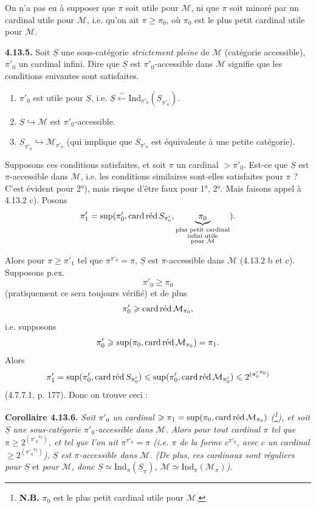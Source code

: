 \documentclass[11pt]{article}
\newcommand{\msp}[1]{\marginpar{\footnotesize [#1]}}
\newcommand{\Ind}{\mathrm{Ind}}
\newcommand{\card}{\operatorname{card}}
\newcommand{\M}{\mathcal{M}}
\newcommand{\red}{\mathop{\textup{réd}}\nolimits}
\newcommand{\uS}{\underline{S}}
\begin{document}
On n'a pas eu à supposer que $\pi$ soit utile pour $\M$, ni que $\pi$ soit minoré par un cardinal utile pour $\M$, i.e. qu'on ait $\pi \geqslant \pi_0$, où $\pi_0$ est le plus petit cardinal utile pour $\M$.

\msp{page 289}
\textbf{4.13.5.} Soit $\uS$ une sous-catégorie \textit{strictement pleine} de $\M$ (catégorie accessible), $\pi'_0$ un cardinal infini. Dire que $\uS$ est $\pi'_0$-accessible dans $\M$ signifie que les conditions suivantes sont satisfaites.
\begin{enumerate}
\item[1)] $\pi'_0$ est utile pour $\uS$, i.e. $\uS \xleftarrow{\sim} \Ind_{\pi'_0}(\uS_{\pi'_0})$.
\item[2)] $\uS \hookrightarrow \M$ est $\pi'_0$-accessible.
\item[3)] $\uS_{\pi'_0} \hookrightarrow \M_{\pi'_0}$ (qui implique que $S_{\pi'_0}$ est équivalente à une petite catégorie).
\end{enumerate}
Supposons ces conditions satisfaites, et soit $\pi$ un cardinal $> \pi'_0$. Est-ce que $\uS$ est $\pi$-accessible dans $\M$, i.e. les conditions similaires sont-elles satisfaites pour $\pi$ ? C'est évident pour 2°), mais risque d'être faux pour 1°, 2°. Mais faisons appel à 4.13.2 c). Posons
\[
\pi'_1 = \sup(\pi'_0, \card\red S_{\pi'_0}, \underbrace{\pi_0}_{\substack{\text{plus petit cardinal}\\ \text{infini utile}\\ \text{pour } \M}} ) .
\]

\msp{page 290}
Alors pour $\pi \geqslant \pi'_1$ tel que $\pi^{\pi'_0} = \pi$, $\uS$ est $\pi$-accessible dans $\M$ (4.13.2 b et c). Supposons p.ex.
\[
\pi'_0 \geqslant \pi_0
\]
(pratiquement ce sera toujours vérifié) et de plus
\[
\pi'_0 \geqslant \card\red\M_{\pi_0} ,
\]
i.e. supposons
\[
\pi'_0 \geqslant \sup(\pi_0, \card\red\M_{\pi_0}) = \pi_1 .
\]
Alors
\[
\pi'_1 = \sup(\pi'_0, \card\red S_{\pi'_0}) \leqslant \sup(\pi'_0, \card\red\M_{\pi'_0}) \leqslant 2^{({\pi'_0}^{\pi_0})}
\]
(4.7.7.1, p. 177). Donc on trouve ceci :

\textbf{Corollaire 4.13.6.} \textit{Soit $\pi'_0$ un cardinal $\geqslant \pi_1 = \sup(\pi_0, \card\red\M_{\pi_0})$ (\footnote[118]{\textbf{N.B.} $\pi_0$ est le plus petit cardinal utile pour $\M$.}), et soit $\uS$ une sous-catégorie $\pi'_0$-accessible dans $\M$. Alors pour tout cardinal $\pi$ tel que $\pi \geqslant 2^{({\pi'_0}^{\pi_0})}$, et tel que l'on ait $\pi^{\pi'_0} = \pi$ (i.e. $\pi$ de la forme $c^{\pi'_0}$, avec $c$ un cardinal $\geqslant 2^{({\pi'_0}^{\pi_0})}$), $\uS$ est $\pi$-accessible dans $\M$. (De plus, ces cardinaux sont réguliers pour $\uS$} et \textit{pour $\M$, donc $\uS \simeq \Ind_\pi(\uS_\pi)$, $\M \simeq \Ind_\pi(\M_\pi)$).}
\end{document}
